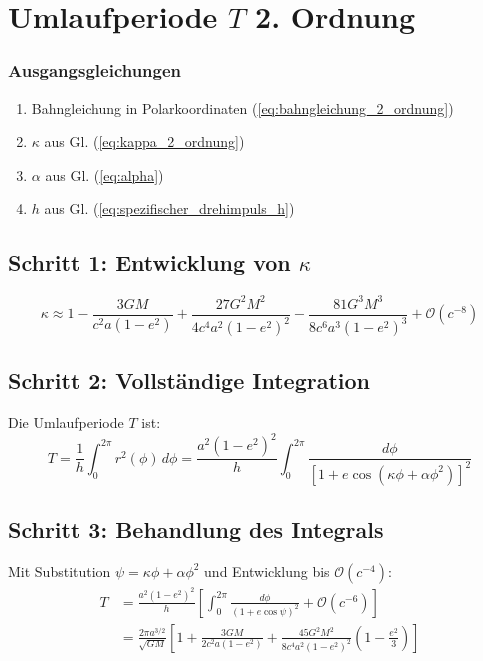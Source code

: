\newpage
\section{Umlaufperiode \( T \) 2. Ordnung}

\subsubsection*{Ausgangsgleichungen}
\begin{enumerate}
    \item Bahngleichung in Polarkoordinaten (\ref{eq:bahngleichung_2_ordnung})
    \item $\kappa$ aus Gl. (\ref{eq:kappa_2_ordnung})
    \item $\alpha$ aus Gl. (\ref{eq:alpha})
    \item $h$ aus Gl. (\ref{eq:spezifischer_drehimpuls_h})
\end{enumerate}

\subsection*{Schritt 1: Entwicklung von \(\kappa\)}
\begin{equation}
\kappa \approx 1 - \frac{3GM}{c^2a(1-e^2)} + \frac{27G^2M^2}{4c^4a^2(1-e^2)^2} - \frac{81G^3M^3}{8c^6a^3(1-e^2)^3} + \mathcal{O}(c^{-8}) 
\end{equation}

\subsection*{Schritt 2: Vollständige Integration}
Die Umlaufperiode \( T \) ist:
\begin{equation}
T = \frac{1}{h} \int_0^{2\pi} r^2(\phi) \, d\phi = \frac{a^2(1-e^2)^2}{h} \int_0^{2\pi} \frac{d\phi}{\left[1 + e\cos\left(\kappa\phi + \alpha\phi^2\right)\right]^2}
\end{equation}

\subsection*{Schritt 3: Behandlung des Integrals}
Mit Substitution \(\psi = \kappa\phi + \alpha\phi^2\) und Entwicklung bis \(\mathcal{O}(c^{-4})\):
\begin{align}
T &= \frac{a^2(1-e^2)^2}{h} \left[ \int_0^{2\pi} \frac{d\phi}{(1 + e\cos\psi)^2} + \mathcal{O}(c^{-6}) \right] \\
  &= \frac{2\pi a^{3/2}}{\sqrt{GM}} \left[1 + \frac{3GM}{2c^2a(1-e^2)} + \frac{45G^2M^2}{8c^4a^2(1-e^2)^2}\left(1 - \frac{e^2}{3}\right)\right]
\end{align}

